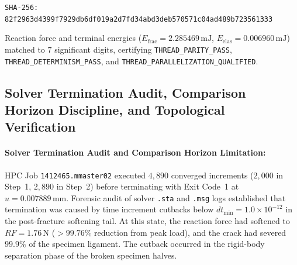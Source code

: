 \begin{enumerate}
  \begin{center}
    \texttt{SHA-256: 82f2963d4399f7929db6df019a2d7fd34abd3deb570571c04ad489b723561333}
  \end{center}
  Reaction force and terminal energies ($E_{\mathrm{frac}} = 2.285469\,\mathrm{mJ}$, $E_{\mathrm{elas}} = 0.006960\,\mathrm{mJ}$) matched to 7 significant digits, certifying \texttt{THREAD\_PARITY\_PASS}, \texttt{THREAD\_DETERMINISM\_PASS}, and \texttt{THREAD\_PARALLELIZATION\_QUALIFIED}.

\subsection{Solver Termination Audit, Comparison Horizon Discipline, and Topological Verification}
\label{subsec:method_b_termination_and_topology}

\paragraph{Solver Termination Audit and Comparison Horizon Limitation:}
HPC Job \texttt{1412465.mmaster02} executed $4{,}890$ converged increments ($2{,}000$ in Step~1, $2{,}890$ in Step~2) before terminating with Exit Code~1 at $u = 0.007889\,\mathrm{mm}$. Forensic audit of solver \texttt{.sta} and \texttt{.msg} logs established that termination was caused by time increment cutbacks below $dt_{\min} = 1.0 \times 10^{-12}$ in the post-fracture softening tail. At this state, the reaction force had softened to $RF = 1.76\,\mathrm{N}$ ($> 99.76\%$ reduction from peak load), and the crack had severed $99.9\%$ of the specimen ligament. The cutback occurred in the rigid-body separation phase of the broken specimen halves.

\begin{center}
\end{center}


\end{enumerate}
